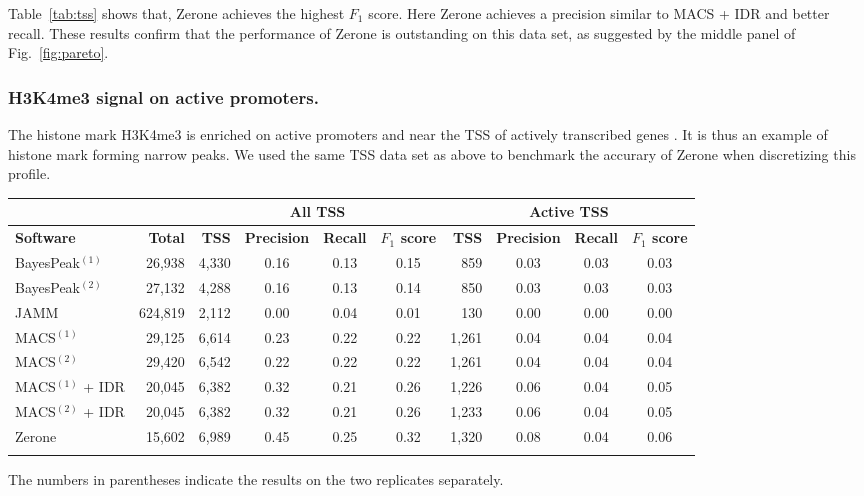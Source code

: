 \documentclass{bioinfo}
\begin{document}
Table~\ref{tab:tss} shows that, Zerone achieves the highest $F_1$
score. Here Zerone achieves a precision similar to MACS + IDR and
better recall. These results confirm that the performance of Zerone is
outstanding on this data set, as suggested by the middle panel of
Fig.~\ref{fig:pareto}.

\subsubsection{H3K4me3 signal on active promoters.}
\label{subsub:h3k4me3}
The histone mark H3K4me3 is enriched on active promoters and
near the TSS of actively transcribed genes
\citep{pmid15680324,pmid17512414,pmid17277777}. It is thus an example
of histone mark forming narrow peaks. We used the same TSS data set
as above to benchmark the accurary of Zerone when discretizing
this profile.

\begin{table}[!t]
{\begin{tabular}{lr|rccc|rccc}
        \multicolumn{2}{c}{} & \multicolumn{4}{c}{\textbf{All TSS}} & \multicolumn{4}{c}{\textbf{Active TSS}} \\
        \midrule
        \textbf{Software} & \textbf{Total} &
        \textbf{TSS} & \textbf{Precision} & \textbf{Recall} & \textbf{$F_{1}$ score} &
        \textbf{TSS} & \textbf{Precision} & \textbf{Recall} & \textbf{$F_{1}$ score} \\
        \midrule
        BayesPeak$^{(1)}$  &  26,938 & 4,330 & 0.16 & 0.13 & 0.15 &   859 & 0.03 & 0.03 & 0.03 \\
        BayesPeak$^{(2)}$  &  27,132 & 4,288 & 0.16 & 0.13 & 0.14 &   850 & 0.03 & 0.03 & 0.03 \\
        JAMM               & 624,819 & 2,112 & 0.00 & 0.04 & 0.01 &   130 & 0.00 & 0.00 & 0.00 \\
        MACS$^{(1)}$       &  29,125 & 6,614 & 0.23 & 0.22 & 0.22 & 1,261 & 0.04 & 0.04 & 0.04 \\
        MACS$^{(2)}$       &  29,420 & 6,542 & 0.22 & 0.22 & 0.22 & 1,261 & 0.04 & 0.04 & 0.04 \\
        MACS$^{(1)}$ + IDR &  20,045 & 6,382 & 0.32 & 0.21 & 0.26 & 1,226 & 0.06 & 0.04 & 0.05 \\
        MACS$^{(2)}$ + IDR &  20,045 & 6,382 & 0.32 & 0.21 & 0.26 & 1,233 & 0.06 & 0.04 & 0.05 \\
        Zerone             &  15,602 & 6,989 & 0.45 & 0.25 & 0.32 & 1,320 & 0.08 & 0.04 & 0.06 \\
        \botrule
\end{tabular}}{The numbers in parentheses indicate the results on the two
replicates separately.}
\end{table}
\end{document}
